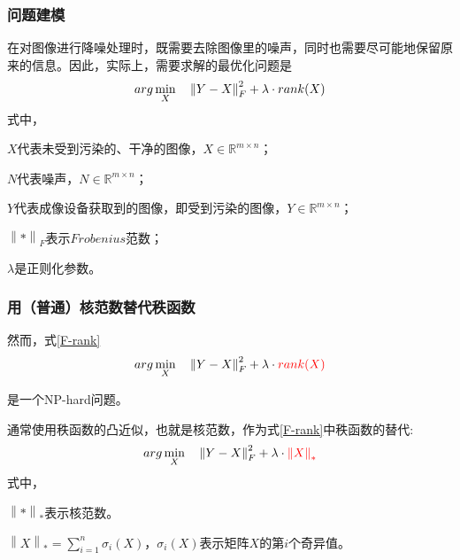 \documentclass[10pt,aspectratio=43,mathserif]{beamer}
\begin{document}
\begin{frame}
\frametitle{\textbf{问题建模}}
\par 在对图像进行降噪处理时，既需要去除图像里的噪声，同时也需要尽可能地保留原来的信息。因此，实际上，需要求解的最优化问题是
\begin{equation}
\centering
arg\min\limits_{X} \quad \left\|Y-X\right\|_F^2 + \lambda \cdot rank(X)
\label{F-rank}
\end{equation}
式中，
\par$X$代表未受到污染的、干净的图像，$X \in \mathbb{R}^{m \times n}$；
\par$N$代表噪声，$N \in \mathbb{R}^{m \times n}$；
\par$Y$代表成像设备获取到的图像，即受到污染的图像，$Y \in \mathbb{R}^{m \times n}$；
\par$\left\|*\right\|_F$表示$Frobenius$范数；
\par$\lambda$是正则化参数。

\end{frame}

\begin{frame}
\frametitle{\textbf{用（普通）核范数替代秩函数}}
\par 然而，式\ref{F-rank}
\begin{displaymath}
arg\min\limits_{X} \quad \left\|Y-X\right\|_F^2 + \lambda \cdot {\color{red}{rank(X)}}
\end{displaymath}
\par 是一个NP-hard问题。
\newline
\newline
\par 通常使用秩函数的凸近似，也就是核范数，作为式\ref{F-rank}中秩函数的替代:
\begin{equation}
\centering
arg\min\limits_{X} \quad \left\|Y-X\right\|_F^2 + \lambda \cdot {\color{red}{\left\|X\right\|_*}}
\label{F-NN}
\end{equation}
式中，
\par $\left\|*\right\|_*$表示核范数。
\par $\left\|X\right\|_* = \sum\limits_{i=1}^{n}\sigma_i(X)$，$\sigma_i(X)$表示矩阵$X$的第$i$个奇异值。
\end{frame}
\end{document}
